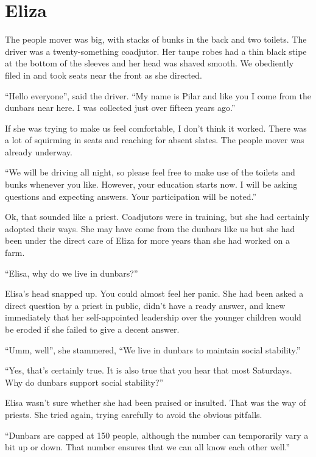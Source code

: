 %
%

\chapter{Eliza}

The people mover was big, with stacks of bunks in the back and two toilets. The driver was a twenty-something coadjutor. Her taupe robes had a thin black stipe at the bottom of the sleeves and her head was shaved smooth. We obediently filed in and took seats near the front as she directed.

``Hello everyone'', said the driver. ``My name is Pilar and like you I come from the dunbars near here. I was collected just over fifteen years ago.''

If she was trying to make us feel comfortable, I don't think it worked. There was a lot of squirming in seats and reaching for absent slates. The people mover was already underway.

``We will be driving all night, so please feel free to make use of the toilets and bunks whenever you like. However, your education starts now. I will be asking questions and expecting answers. Your participation will be noted.''

Ok, that sounded like a priest. Coadjutors were in training, but she had certainly adopted their ways. She may have come from the dunbars like us but she had been under the direct care of Eliza for more years than she had worked on a farm.

``Elisa, why do we live in dunbars?''

Elisa's head snapped up. You could almost feel her panic. She had been asked a direct question by a priest in public, didn't have a ready answer, and knew immediately that her self-appointed leadership over the younger children would be eroded if she failed to give a decent answer.

``Umm, well'', she stammered, ``We live in dunbars to maintain social stability.''

``Yes, that's certainly true. It is also true that you hear that most Saturdays. Why do dunbars support social stability?''

Elisa wasn't sure whether she had been praised or insulted. That was the way of priests. She tried again, trying  carefully to avoid the obvious pitfalls.

``Dunbars are capped at 150 people, although the number can temporarily vary a bit up or down. That number ensures that we can all know each other well.''

